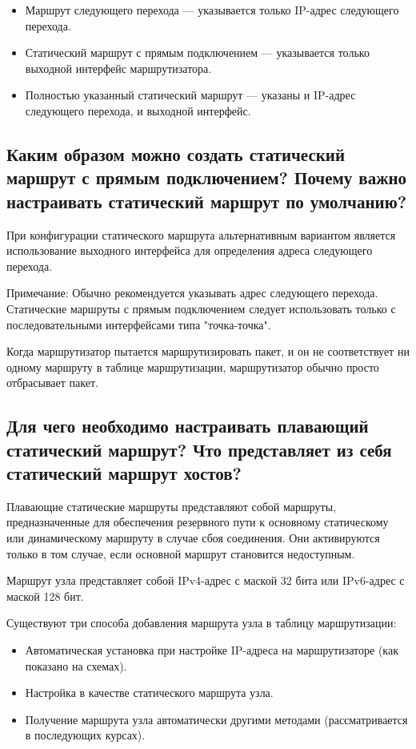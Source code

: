 \begin{itemize}
    \item Маршрут следующего перехода --- указывается только IP-адрес
    следующего перехода.
    \item Статический маршрут с прямым подключением --- указывается
    только выходной интерфейс маршрутизатора.
    \item Полностью указанный статический маршрут --- указаны и IP-адрес
    следующего перехода, и выходной интерфейс.
\end{itemize}

\subsection{Каким образом можно создать статический маршрут
с прямым подключением?
Почему важно настраивать статический маршрут по умолчанию?}

При конфигурации статического маршрута альтернативным вариантом
является использование выходного интерфейса для определения адреса
следующего перехода.\par
Примечание: Обычно рекомендуется указывать адрес следующего перехода.
Статические маршруты с прямым подключением следует использовать только
с последовательными интерфейсами типа "точка-точка".\par
Когда маршрутизатор пытается маршрутизировать пакет,
и он не соответствует ни одному маршруту в таблице маршрутизации,
маршрутизатор обычно просто отбрасывает пакет.

\subsection{Для чего необходимо настраивать плавающий статический маршрут?
Что представляет из себя статический маршрут хостов?}

Плавающие статические маршруты представляют собой маршруты,
предназначенные для обеспечения резервного пути к основному статическому
или динамическому маршруту в случае сбоя соединения.
Они активируются только в том случае,
если основной маршрут становится недоступным.\par
Маршрут узла представляет собой IPv4-адрес с маской 32 бита
или IPv6-адрес с маской 128 бит.\par
Существуют три способа добавления маршрута узла в таблицу маршрутизации:

\begin{itemize}
    \item Автоматическая установка при настройке IP-адреса
    на маршрутизаторе (как показано на схемах).
    \item Настройка в качестве статического маршрута узла.
    \item Получение маршрута узла автоматически другими методами
    (рассматривается в последующих курсах).
\end{itemize}

